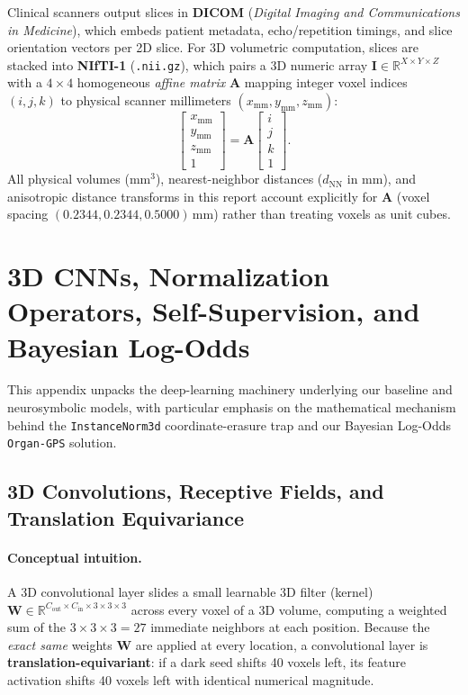 \documentclass[10pt,a4paper]{article}
\renewcommand{\_}{\origunderscore\allowbreak}
\begin{document}
Clinical scanners output slices in \textbf{DICOM} (\emph{Digital Imaging and Communications in Medicine}), which embeds patient metadata, echo/repetition timings, and slice orientation vectors per 2D slice. For 3D volumetric computation, slices are stacked into \textbf{NIfTI-1} (\texttt{.nii.gz}), which pairs a 3D numeric array $\mathbf{I} \in \mathbb{R}^{X \times Y \times Z}$ with a $4 \times 4$ homogeneous \emph{affine matrix} $\mathbf{A}$ mapping integer voxel indices $(i,j,k)$ to physical scanner millimeters $(x_{\text{mm}}, y_{\text{mm}}, z_{\text{mm}})$:
\begin{equation}
    \begin{bmatrix} x_{\text{mm}} \\ y_{\text{mm}} \\ z_{\text{mm}} \\ 1 \end{bmatrix}
    = \mathbf{A} \begin{bmatrix} i \\ j \\ k \\ 1 \end{bmatrix}.
\end{equation}
All physical volumes ($\text{mm}^3$), nearest-neighbor distances ($d_{\text{NN}}$ in $\text{mm}$), and anisotropic distance transforms in this report account explicitly for $\mathbf{A}$ (voxel spacing $(0.2344, 0.2344, 0.5000)\,\text{mm}$) rather than treating voxels as unit cubes.

\clearpage
\section[3D CNNs, InstanceNorm \& Bayes Log-Odds]{3D CNNs, Normalization Operators, Self-Supervision, and Bayesian Log-Odds}
\label{app:dl}

This appendix unpacks the deep-learning machinery underlying our baseline and neurosymbolic models, with particular emphasis on the mathematical mechanism behind the \texttt{InstanceNorm3d} coordinate-erasure trap and our Bayesian Log-Odds \texttt{Organ-GPS} solution.

\subsection{3D Convolutions, Receptive Fields, and Translation Equivariance}

\paragraph{Conceptual intuition.} A 3D convolutional layer slides a small learnable 3D filter (kernel) $\mathbf{W} \in \mathbb{R}^{C_{\text{out}} \times C_{\text{in}} \times 3 \times 3 \times 3}$ across every voxel of a 3D volume, computing a weighted sum of the $3 \times 3 \times 3 = 27$ immediate neighbors at each position. Because the \emph{exact same} weights $\mathbf{W}$ are applied at every location, a convolutional layer is \textbf{translation-equivariant}: if a dark seed shifts 40 voxels left, its feature activation shifts 40 voxels left with identical numerical magnitude.
\end{document}
